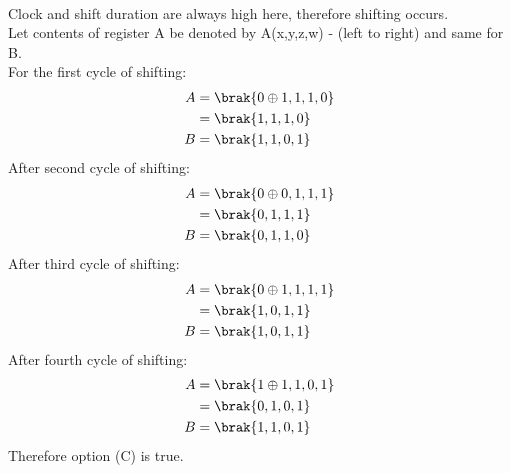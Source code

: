 \documentclass[journal,12pt,onecolumn]{IEEEtran}
\theoremstyle{remark}
\begin{document}
\solution \\
Clock and shift duration are always high here, therefore shifting occurs.\\
Let contents of register A be denoted by A(x,y,z,w) - (left to right) and same for B.\\
For the first cycle of shifting:
\begin{align}
A &= \brak{0 \oplus 1,1,1,0}\\
   &= \brak{1,1,1,0}\\
    B& =\brak{1,1,0,1}
\end{align}
After second cycle of shifting:
\begin{align}
A &= \brak{0 \oplus 0,1,1,1}\\
   &= \brak{0,1,1,1}\\
    B& =\brak{0,1,1,0}
\end{align}
After third cycle of shifting:
\begin{align}
A &= \brak{0 \oplus 1,1,1,1}\\
   &= \brak{1,0,1,1}\\
    B& =\brak{1,0,1,1}
\end{align}
After fourth cycle of shifting:
\begin{align}
A &= \brak{1 \oplus 1,1,0,1}\\
   &= \brak{0,1,0,1}\\
    B& =\brak{1,1,0,1}
\end{align}
Therefore option (C) is true.
\end{document}
